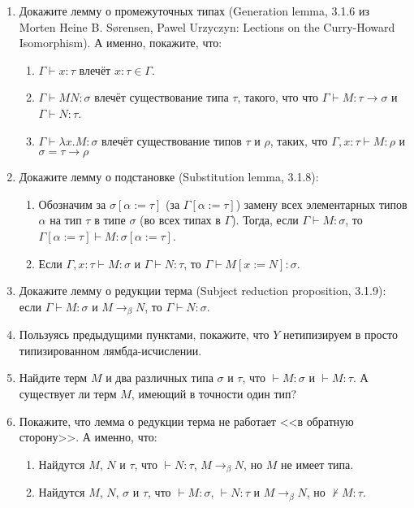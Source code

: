 \documentclass[10pt,a4paper,oneside]{article}
\begin{document}
\begin{enumerate}
\item Докажите лемму о промежуточных типах (Generation lemma, 3.1.6 из 
Morten Heine B. Sørensen, Pawel Urzyczyn: Lections on the Curry-Howard Isomorphism). 
А именно, покажите, что:
  \begin{enumerate}
  \item $\Gamma \vdash x : \tau$ влечёт $x : \tau \in \Gamma$.
  \item $\Gamma \vdash M N : \sigma$ влечёт существование типа $\tau$, такого, что
    что $\Gamma \vdash M : \tau\rightarrow\sigma$ и $\Gamma \vdash N : \tau$.
  \item $\Gamma \vdash \lambda x.M : \sigma$ влечёт существование типов $\tau$ и $\rho$, таких, что
    $\Gamma, x: \tau \vdash M : \rho$ и $\sigma = \tau\rightarrow\rho$
  \end{enumerate}

\item Докажите лемму о подстановке (Substitution lemma, 3.1.8):
\begin{enumerate}
   \item Обозначим за $\sigma[\alpha:=\tau]$ (за $\Gamma[\alpha:=\tau]$) замену всех элементарных 
   типов $\alpha$ на тип $\tau$ в типе $\sigma$ (во всех типах в $\Gamma$). 
   Тогда, если $\Gamma \vdash M : \sigma$, то $\Gamma[\alpha := \tau] \vdash M : \sigma [\alpha := \tau]$.
   \item Если $\Gamma, x:\tau \vdash M : \sigma$ и $\Gamma \vdash N : \tau$, то $\Gamma \vdash M[x := N]:\sigma$.
\end{enumerate}

\item Докажите лемму о редукции терма (Subject reduction proposition, 3.1.9):
    если $\Gamma\vdash M:\sigma$ и $M \rightarrow_\beta N$, то $\Gamma \vdash N:\sigma$.

\item Пользуясь предыдущими пунктами, покажите, что $Y$ нетипизируем в просто типизированном лямбда-исчислении.

\item Найдите терм $M$ и два различных типа $\sigma$ и $\tau$, что $\vdash M: \sigma$ и $\vdash M:\tau$.
    А существует ли терм $M$, имеющий в точности один тип?

\item Покажите, что лемма о редукции терма не работает <<в обратную сторону>>. А именно, что:
   \begin{enumerate}
   \item Найдутся $M$, $N$ и $\tau$, что $\vdash N:\tau$, $M \rightarrow_\beta N$, но $M$ не имеет типа.
   \item Найдутся $M$, $N$, $\sigma$ и $\tau$, что $\vdash M:\sigma$, $\vdash N:\tau$ и $M \rightarrow_\beta N$, но
     $\nvdash M:\tau$.
   \end{enumerate}
\end{enumerate}
\end{document}
